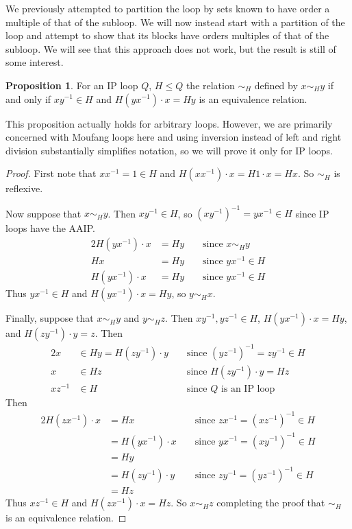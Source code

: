 \documentclass[12pt, twoside, openright]{report}
\theoremstyle{definition}
\newtheorem{prp}[thm]{Proposition}
\begin{document}
We previously attempted to partition the loop by sets known to have order a multiple of that of
  the subloop. We will now instead start with a partition of the loop and attempt to show that
  its blocks have orders multiples of that of the subloop. We will see that this approach does
  not work, but the result is still of some interest.

\begin{prp}
  For an IP loop $Q$, $H\leq Q$ the relation $\sim_H$ defined by $x\sim_H y$ if and only if $xy^{-1} \in H$
    and $H(yx^{-1})\cdot x = Hy$ is an equivalence relation.
\end{prp}

This proposition actually holds for arbitrary loops. However, we are primarily concerned with Moufang
  loops here and using inversion instead of left and right division substantially simplifies notation,
  so we will prove it only for IP loops.

\begin{proof}
  First note that $xx^{-1} = 1\in H$ and $H(xx^{-1})\cdot x = H1\cdot x = Hx$. So $\sim_H$ is reflexive.

  Now suppose that $x\sim_H y$. Then $xy^{-1}\in H$, so $(xy^{-1})^{-1} = yx^{-1}\in H$ since IP loops
    have the AAIP.
  \begin{alignat*}{2}
    H(yx^{-1})\cdot x &= Hy &&\text{ since $x\sim_H y$}\\
    Hx &= Hy &&\text{ since $yx^{-1}\in H$}\\
    H(yx^{-1})\cdot x &= Hy &&\text{ since $yx^{-1}\in H$} 
  \end{alignat*}
  Thus $yx^{-1}\in H$ and $H(yx^{-1})\cdot x = Hy$, so $y\sim_H x$.

  Finally, suppose that $x\sim_H y$ and $y\sim_H z$. Then $xy^{-1}, yz^{-1}\in H$,
    $H(yx^{-1})\cdot x = Hy$, and $H(zy^{-1})\cdot y = z$. Then
  \begin{alignat*}{2}
    x&\in Hy = H(zy^{-1})\cdot y &&\text{ since $(yz^{-1})^{-1} = zy^{-1}\in H$}\\
    x&\in Hz &&\text{ since $H(zy^{-1})\cdot y = Hz$}\\
    xz^{-1}&\in H &&\text{ since $Q$ is an IP loop}
  \end{alignat*}
  Then
  \begin{alignat*}{2}
    H(zx^{-1})\cdot x &= Hx &&\text{ since $zx^{-1} = (xz^{-1})^{-1}\in H$}\\
    &= H(yx^{-1})\cdot x &&\text{ since $yx^{-1} = (xy^{-1})^{-1}\in H$}\\
    &= Hy &&\\
    &= H(zy^{-1})\cdot y &&\text{ since $zy^{-1} = (yz^{-1})^{-1}\in H$}\\
    &= Hz &&
  \end{alignat*}
  Thus $xz^{-1}\in H$ and $H(zx^{-1})\cdot x = Hz$. So $x\sim_H z$ completing the proof that
    $\sim_H$ is an equivalence relation.
\end{proof}
\end{document}
